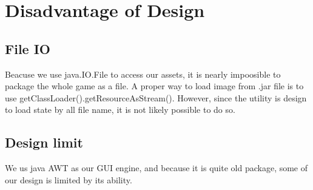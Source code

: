 \section{Disadvantage of Design}
\subsection{File IO}
Beacuse we use java.IO.File to access our assets, it is nearly impoosible to package the whole game as a file.
A proper way to load image from .jar file is to use getClassLoader().getResourceAsStream(). However, since the utility is design to load state by
all file name, it is not likely possible to do so.
\subsection{Design limit}
We us java AWT as our GUI engine, and because it is quite old package, some of our design is limited by its ability.
